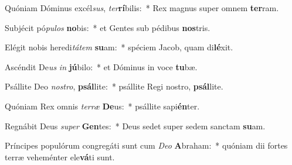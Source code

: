 \item Quóniam Dóminus excél\textit{sus}, \textit{ter}\textbf{rí}bilis:~* Rex magnus super omnem \textbf{ter}ram.
\item Subjécit pó\textit{pu}\textit{los} \textbf{no}bis:~* et Gentes sub pédibus \textbf{nos}tris.
\item Elégit nobis heredi\textit{tá}\textit{tem} \textbf{su}am:~* spéciem Jacob, quam di\textbf{lé}xit.
\item Ascéndit De\textit{us} \textit{in} \textbf{jú}bilo:~* et Dóminus in voce \textbf{tu}bæ.
\item Psállite Deo \textit{nos}\textit{tro}, \textbf{psál}lite:~* psállite Regi nostro, \textbf{psál}lite.
\item Quóniam Rex omnis \textit{ter}\textit{ræ} \textbf{De}us:~* psállite sapi\textbf{én}ter.
\item Regnábit Deus \textit{su}\textit{per} \textbf{Gen}tes:~* Deus sedet super sedem sanctam \textbf{su}am.
\item Príncipes populórum congregáti sunt cum \textit{De}\textit{o} \textbf{A}braham:~* quóniam dii fortes terræ veheménter ele\textbf{vá}ti sunt.
